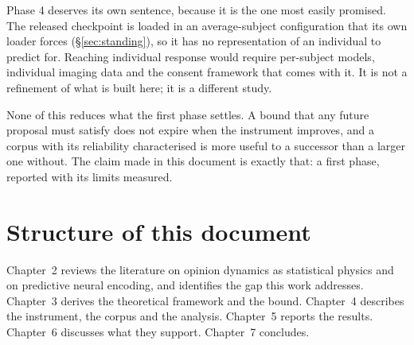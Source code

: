 Phase 4 deserves its own sentence, because it is the one most easily promised. The released
checkpoint is loaded in an average-subject configuration that its own loader forces
(\S\ref{sec:standing}), so it has no representation of an individual to predict for. Reaching
individual response would require per-subject models, individual imaging data and the consent
framework that comes with it. It is not a refinement of what is built here; it is a different
study.

None of this reduces what the first phase settles. A bound that any future proposal must
satisfy does not expire when the instrument improves, and a corpus with its reliability
characterised is more useful to a successor than a larger one without. The claim made in this
document is exactly that: a first phase, reported with its limits measured.

\section{Structure of this document}

Chapter~2 reviews the literature on opinion dynamics as statistical physics and on predictive
neural encoding, and identifies the gap this work addresses. Chapter~3 derives the
theoretical framework and the bound. Chapter~4 describes the instrument, the corpus and the
analysis. Chapter~5 reports the results. Chapter~6 discusses what they support. Chapter~7
concludes.

